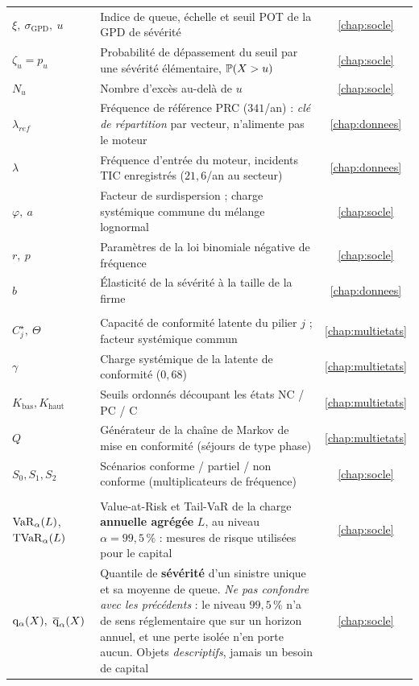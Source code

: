 {\begin{longtable}{>{\raggedright}p{3.3cm} >{\raggedright\arraybackslash}p{10.2cm} c}
$\xi,\ \sigma_{\text{GPD}},\ u$ & Indice de queue, échelle et seuil POT de la GPD de sévérité & \ref{chap:socle} \\
$\zeta_u=p_u$ & Probabilité de dépassement du seuil par une sévérité élémentaire, $\mathbb{P}(X>u)$ & \ref{chap:socle} \\
$N_u$ & Nombre d'excès au-delà de $u$ & \ref{chap:socle} \\
$\lambda_{ref}$ & Fréquence de référence PRC ($341$/an) : \emph{clé de répartition} par vecteur, n'alimente pas le moteur & \ref{chap:donnees} \\
$\lambda$ & Fréquence d'entrée du moteur, incidents TIC enregistrés ($21{,}6$/an au secteur) & \ref{chap:donnees} \\
$\varphi,\ a$ & Facteur de surdispersion ; charge systémique commune du mélange lognormal & \ref{chap:socle} \\
$r,\ p$ & Paramètres de la loi binomiale négative de fréquence & \ref{chap:socle} \\
$b$ & Élasticité de la sévérité à la taille de la firme & \ref{chap:donnees} \\
\midrule
\multicolumn{3}{@{}l}{\emph{\textcolor{navy}{Conformité multi-états}}} \\
$C^\star_j,\ \Theta$ & Capacité de conformité latente du pilier $j$ ; facteur systémique commun & \ref{chap:multietats} \\
$\gamma$ & Charge systémique de la latente de conformité ($0{,}68$) & \ref{chap:multietats} \\
$K_{\text{bas}},K_{\text{haut}}$ & Seuils ordonnés découpant les états NC / PC / C & \ref{chap:multietats} \\
$Q$ & Générateur de la chaîne de Markov de mise en conformité (séjours de type phase) & \ref{chap:multietats} \\
$S_0,S_1,S_2$ & Scénarios conforme / partiel / non conforme (multiplicateurs de fréquence) & \ref{chap:socle} \\
\midrule
\multicolumn{3}{@{}l}{\emph{\textcolor{navy}{Capital, allocation et décision}}} \\
$\mathrm{VaR}_\alpha(L)$, $\mathrm{TVaR}_\alpha(L)$ & Value-at-Risk et Tail-VaR de la charge \textbf{annuelle agrégée} $L$, au niveau $\alpha=99{,}5\,\%$ : mesures de risque utilisées pour le capital & \ref{chap:socle} \\
$\mathrm{q}_\alpha(X),\ \overline{\mathrm{q}}_\alpha(X)$ & Quantile de \textbf{sévérité} d'un sinistre unique et sa moyenne de queue. \emph{Ne pas confondre avec les précédents} : le niveau $99{,}5\,\%$ n'a de sens réglementaire que sur un horizon annuel, et une perte isolée n'en porte aucun. Objets \emph{descriptifs}, jamais un besoin de capital & \ref{chap:socle} \\

\end{longtable}}
